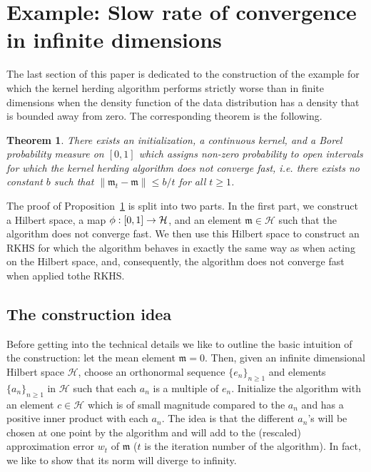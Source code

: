 \documentclass[10pt]{amsart}
\newtheorem{theo}{Theorem}[section]
\theoremstyle{definition}\newtheorem{defi}[theo]{Definition}\newtheorem{rema}[theo]{Remark}\newtheorem{exam}[theo]{Example}\newtheorem{exem}[theo]{Example}\newtheorem{nota}[theo]{Notation}
\theoremstyle{remark}
\newcommand{\cH}{\mathcal{H}}
\newcommand{\mean}{\mathfrak{m}}
\renewcommand*{\to}{\mathchoice{\longrightarrow}{\rightarrow}{\rightarrow}{\rightarrow}}
\begin{document}
\section{Example: Slow rate of convergence in infinite dimensions}

The last section of this paper is dedicated to the construction of the example for which the kernel herding algorithm performs strictly worse than in finite dimensions when the density function of the data distribution has a density that is bounded away from zero. The corresponding theorem is the following.

\begin{theo}\label{prop:counter-main}
There exists an initialization, a continuous kernel, and a Borel probability measure on $[0,1]$ which assigns non-zero probability to open intervals for which the kernel herding algorithm does not converge fast, i.e. there exists no constant $b$ such that $\|\mean_t- \mean \| \leq b/t$ for all $t \geq 1$.
\end{theo}

The proof of Proposition~\ref{prop:counter-main} is split into two parts. In the first part, we construct a Hilbert space, a map $\phi: [0,1]\to \cH$, and an element $\mean \in \cH$ such that the algorithm does not converge fast. We then use this Hilbert space to construct an RKHS for which the algorithm behaves in exactly the same way as when acting on the Hilbert space, and, consequently, the algorithm does not converge fast when applied to\linebreak the RKHS.


\subsection*{The construction idea}

Before getting into the technical details we like to outline the basic intuition of the construction: let the mean element $\mean = 0$. Then, given an infinite dimensional Hilbert space $\cH$, choose an orthonormal sequence $\{e_n\}_{n\geq 1}$ and elements $\{a_n\}_{n\geq 1}$ in $\cH$ such that each $a_n$ is a multiple of $e_n$. Initialize the algorithm with an element $c \in \cH$ which is of small magnitude compared to the $a_n$ and has a positive inner product with each $a_n$. The idea is that the different $a_n$'s will be chosen at one point by the algorithm and will add to the (rescaled) approximation error $w_t$ of $\mean$ ($t$ is the iteration number of the algorithm). In fact, we like to show that its norm will diverge to infinity.
\end{document}
